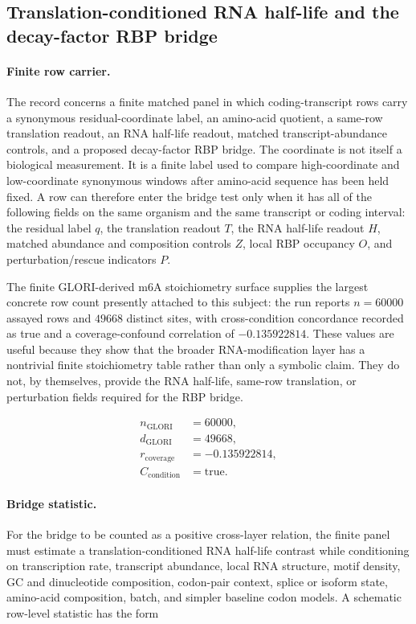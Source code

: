 \subsection{Translation-conditioned RNA half-life and the decay-factor RBP bridge}\label{sec:bioreality-q6-rna-half-life-rbp-bridge}

\paragraph{Finite row carrier.}
The record concerns a finite matched panel in which coding-transcript rows carry a synonymous residual-coordinate label, an amino-acid quotient, a same-row translation readout, an RNA half-life readout, matched transcript-abundance controls, and a proposed decay-factor RBP bridge.  The coordinate is not itself a biological measurement.  It is a finite label used to compare high-coordinate and low-coordinate synonymous windows after amino-acid sequence has been held fixed.  A row can therefore enter the bridge test only when it has all of the following fields on the same organism and the same transcript or coding interval: the residual label $q$, the translation readout $T$, the RNA half-life readout $H$, matched abundance and composition controls $Z$, local RBP occupancy $O$, and perturbation/rescue indicators $P$.

The finite GLORI-derived m6A stoichiometry surface supplies the largest concrete row count presently attached to this subject: the run reports $n=60000$ assayed rows and $49668$ distinct sites, with cross-condition concordance recorded as true and a coverage-confound correlation of $-0.135922814$.  These values are useful because they show that the broader RNA-modification layer has a nontrivial finite stoichiometry table rather than only a symbolic claim.  They do not, by themselves, provide the RNA half-life, same-row translation, or perturbation fields required for the RBP bridge.

$$
\begin{aligned}
 n_{\mathrm{GLORI}} &= 60000,\\
 d_{\mathrm{GLORI}} &= 49668,\\
 r_{\mathrm{coverage}} &= -0.135922814,\\
 C_{\mathrm{condition}} &= \mathrm{true}.
\end{aligned}
$$

\paragraph{Bridge statistic.}
For the bridge to be counted as a positive cross-layer relation, the finite panel must estimate a translation-conditioned RNA half-life contrast while conditioning on transcription rate, transcript abundance, local RNA structure, motif density, GC and dinucleotide composition, codon-pair context, splice or isoform state, amino-acid composition, batch, and simpler baseline codon models.  A schematic row-level statistic has the form

